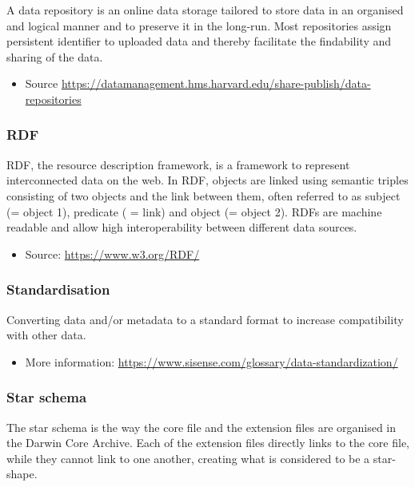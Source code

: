 \documentclass[
  oneside]{book}
\providecommand{\tightlist}{%
  \setlength{\itemsep}{0pt}\setlength{\parskip}{0pt}}
\begin{document}
A data repository is an online data storage tailored to store data in an organised and logical manner and to preserve it in the long-run. Most repositories assign persistent identifier to uploaded data and thereby facilitate the findability and sharing of the data.

\begin{itemize}
\tightlist
\item
  Source \url{https://datamanagement.hms.harvard.edu/share-publish/data-repositories}
\end{itemize}

\subsubsection*{RDF}\label{RDF}

RDF, the resource description framework, is a framework to represent interconnected data on the web. In RDF, objects are linked using semantic triples consisting of two objects and the link between them, often referred to as subject (= object 1), predicate ( = link) and object (= object 2). RDFs are machine readable and allow high interoperability between different data sources.

\begin{itemize}
\tightlist
\item
  Source: \url{https://www.w3.org/RDF/}
\end{itemize}

\subsubsection*{Standardisation}\label{standardise}

Converting data and/or metadata to a standard format to increase compatibility with other data.

\begin{itemize}
\tightlist
\item
  More information: \url{https://www.sisense.com/glossary/data-standardization/}
\end{itemize}

\subsubsection*{Star schema}\label{starschema}

The star schema is the way the core file and the extension files are organised in the Darwin Core Archive. Each of the extension files directly links to the core file, while they cannot link to one another, creating what is considered to be a star-shape.
\end{document}
